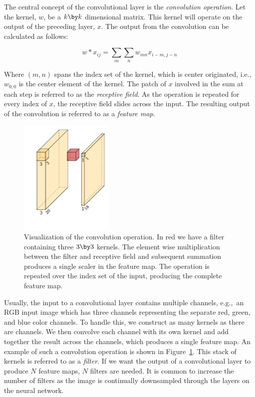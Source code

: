 The central concept of the convolutional layer is the \textit{convolution operation}.
Let the kernel, \(w\), be a \(k\by k\) dimensional matrix.
This kernel will operate on the output of the preceding layer, \(x\).
The output from the convolution can be calculated as follows:

\[w\ast x_{ij}=\sum_{m}\sum_{n}  w_{mn}x_{i-m,j-n}\]

Where \((m,n)\) spans the index set of the kernel, which is center originated, i.e., \(w_{0,0}\) is the center element of the kernel.
The patch of \(x\) involved in the sum at each step is referred to as the \textit{receptive field}.
As the operation is repeated for every index of \(x\), the receptive field slides across the input.
The resulting output of the convolution is referred to as a \textit{feature map}.

\begin{figure}[htb]
  \centering
  \includegraphics[width=0.4\textwidth]{figs/background/conv.pdf}
  \caption[Convolution operation]{Visualization of the convolution operation.
In red we have a filter containing three \(3\by 3\) kernels.
The element wise multiplication between the filter and receptive field and subsequent summation produces a single scaler in the feature map.
The operation is repeated over the index set of the input, producing the complete feature map.}\label{fig:cnn}
\end{figure}

Usually, the input to a convolutional layer contains multiple channels, e.g.,\ an RGB input image which has three channels representing the separate  red, green, and blue color channels.
To handle this, we construct as many kernels as there are channels.
We then convolve each channel with its own kernel and add together the result across the channels, which produces a single feature map.
An example of such a convolution operation is shown in Figure~\ref{fig:cnn}.
This stack of kernels is referred to as a \textit{filter}.
If we want the output of a convolutional layer to produce \(N\) feature maps, \(N\) filters are needed.  It is common to increase the number of filters as the image is continually downsampled through the layers on the neural network.

